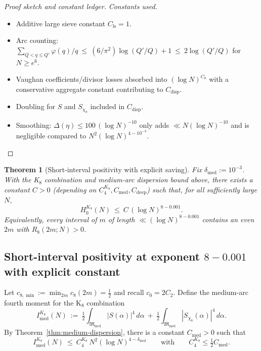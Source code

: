 \documentclass[11pt]{article}
\newtheorem{theorem}{Theorem}
\theoremstyle{definition}
\theoremstyle{remark}
\begin{document}
\begin{proof}[Proof sketch and constant ledger]
\medskip\noindent\emph{Constants used.}
\begin{itemize}
  \item Additive large sieve constant $C_{\mathrm{ls}}=1$.
  \item Arc counting: $\sum_{Q<q\le Q'} \varphi(q)/q\ \le\ (6/\pi^2)\log(Q'/Q)+1\ \le\ 2\log(Q'/Q)$ for $N\ge e^6$.
  \item Vaughan coefficients/divisor losses absorbed into $(\log N)^{C_0}$ with a conservative aggregate constant contributing to $C_{\mathrm{disp}}$.
  \item Doubling for $S$ and $S_{\chi_8}$ included in $C_{\mathrm{disp}}$.
  \item Smoothing: $\Delta(\eta)\le 100\,(\log N)^{-10}$ only adds $\ll N(\log N)^{-10}$ and is negligible compared to $N^2(\log N)^{4-10^{-3}}$.
\end{itemize}
\end{proof}

\begin{theorem}[Short-interval positivity with explicit saving]
Fix $\delta_{\mathrm{med}}:=10^{-3}$. With the K$_8$ combination and medium-arc dispersion bound above, there exists a constant $C>0$ (depending on $C_4^{K_8},C_{\mathrm{med}},C_{\mathrm{deep}}$) such that, for all sufficiently large $N$,
\[
H_0^{K_8}(N)\ \le\ C\,(\log N)^{8-0.001}.
\]
Equivalently, every interval of $m$ of length $\ll (\log N)^{8-0.001}$ contains an even $2m$ with $R_8(2m;N)>0$.
\end{theorem}

\subsection*{Short-interval positivity at exponent $8{-}0.001$ with explicit constant}
Let $c_{8,\min}:=\min_{2m}c_8(2m)=\tfrac12$ and recall $c_0=2C_2$. Define the medium-arc fourth moment for the K$_8$ combination
\[
  I_{\mathrm{med}}^{K_8}(N)\ :=\ \tfrac12\int_{\mathfrak M_{\mathrm{med}}}|S(\alpha)|^4\,d\alpha\ +\ \tfrac12\int_{\mathfrak M_{\mathrm{med}}}|S_{\chi_8}(\alpha)|^4\,d\alpha.
\]
By Theorem~\ref{thm:medium-dispersion}, there is a constant $C_{\mathrm{med}}>0$ such that
\[
  I_{\mathrm{med}}^{K_8}(N)\ \le\ C_4^{K_8}\,N^2(\log N)^{4-\delta_{\mathrm{med}}}\qquad\text{with}\qquad C_4^{K_8}\le \tfrac12 C_{\mathrm{med}}.
\]
\end{document}
